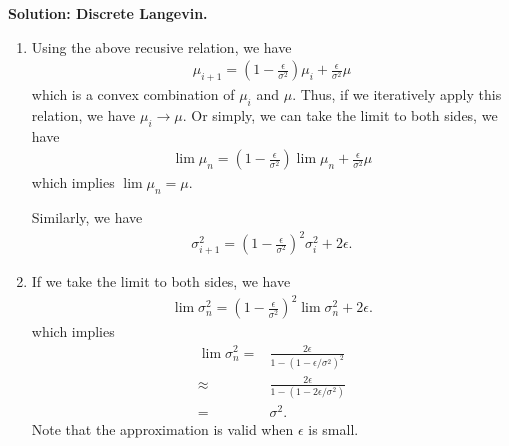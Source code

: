 \documentclass[12pt]{article}
\begin{document}
\begin{enumerate}
\begin{solution}{\bf Solution: Discrete Langevin.}
\begin{enumerate}
\item Using the above recusive relation, we have
\begin{align*}
    \mu_{i+1} = \left(1-\frac{\epsilon}{\sigma^2}\right) \mu_i + \frac{\epsilon}{\sigma^2}\mu
\end{align*}
which is a convex combination of $\mu_i$ and $\mu$.
Thus, if we iteratively apply this relation, we have $\mu_i \rightarrow \mu$.
Or simply, we can take the limit to both sides, we have
\begin{align*}
    \lim \mu_{n} = \left(1-\frac{\epsilon}{\sigma^2}\right) \lim \mu_n + \frac{\epsilon}{\sigma^2}\mu
\end{align*}
which implies $\lim \mu_n = \mu$.

Similarly, we have
\begin{align*}
    \sigma_{i+1}^2 = \left(1-\frac{\epsilon}{\sigma^2}\right)^2 \sigma_i^2 + 2\epsilon.
\end{align*}

\item If we take the limit to both sides, we have
\begin{align*}
    \lim \sigma_{n}^2 = \left(1-\frac{\epsilon}{\sigma^2}\right)^2 \lim \sigma_n^2 + 2\epsilon.
\end{align*}
which implies
\begin{align*}
    \lim \sigma_{n}^2 =& \frac{2\epsilon}{1-(1-\epsilon/\sigma^2)^2}\\
    \approx& \frac{2\epsilon}{1 - (1-2\epsilon/\sigma^2)}\\
    =& \sigma^2.
\end{align*}
Note that the approximation is valid when $\epsilon$ is small.
\end{enumerate}
\end{solution}


\begin{problem}
    \newpage~\newpage~\newpage~\newpage
\end{problem}

\end{enumerate}
\end{document}
